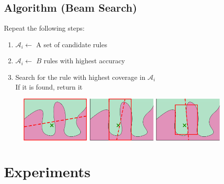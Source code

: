 \documentclass[aspectratio=169]{slide-ja}
\begin{document}
\subsection{Algorithm (Beam Search)}

\begin{frame}{}
  \bigskip
  \bigskip
  Repeat the following steps:
  \begin{enumerate}
    \item $\mathcal{A}_i\gets$ A set of candidate rules
    \item $\mathcal{A}_i\gets$ $B$ rules with highest accuracy
    \item Search for the rule with highest coverage in $\mathcal{A}_i$ \\
          If it is found, return it
  \end{enumerate}
  \vspace{-1em}
  \begin{figure}[t]
    \centering
    \includegraphics[width=0.31\textwidth]{visual-rlime1}
    \includegraphics[width=0.31\textwidth]{visual-rlime2}
    \includegraphics[width=0.31\textwidth]{visual-rlime3}
  \end{figure}
\end{frame}

\section{Experiments}
\end{document}
